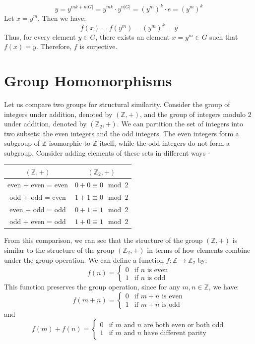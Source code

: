 \documentclass[openany]{book}
\begin{document}
\begin{enumerate}
\[y = y^{mk + n|G|} = y^{mk} \cdot y^{n|G|} = (y^m)^k \cdot e = (y^m)^k\]
    Let \(x = y^m\). Then we have:
    \[f(x) = f(y^m) = (y^m)^k = y\]
    Thus, for every element \(y \in G\), there exists an element \(x = y^m \in G\) such that \(f(x) = y\). Therefore, \(f\) is surjective.
\end{enumerate}
\section{Group Homomorphisms}
Let us compare two groups for structural similarity. Consider the group of integers under addition, denoted by \((\mathbb{Z}, +)\), and the group of integers modulo \(2\) under addition, denoted by \((\mathbb{Z}_2, +)\). We can partition the set of integers into two subsets: the even integers and the odd integers. The even integers form a subgroup of \(\mathbb{Z}\) isomorphic to \(\mathbb{Z}\) itself, while the odd integers do not form a subgroup. Consider adding elements of these sets in different ways -
\begin{center}
\begin{tabular}{c|c}
\((\mathbb{Z}, +)\) & \((\mathbb{Z}_2, +)\) \\
\hline
even + even = even & $0 + 0 \equiv 0 \mod 2$ \\
odd + odd = even & $1 + 1 \equiv 0 \mod 2$ \\
even + odd = odd & $0 + 1 \equiv 1 \mod 2$ \\
odd + even = odd & $1 + 0 \equiv 1 \mod 2$ \\
\hline
\end{tabular}
\end{center}
From this comparison, we can see that the structure of the group \((\mathbb{Z}, +)\) is similar to the structure of the group \((\mathbb{Z}_2, +)\) in terms of how elements combine under the group operation. We can define a function $f: \mathbb{Z} \to \mathbb{Z}_2$ by:
\[f(n) = \begin{cases}0 & \text{if } n \text{ is even} \\ 1 & \text{if } n \text{ is odd}\end{cases}\]
This function preserves the group operation, since for any \(m, n \in \mathbb{Z}\), we have:
\[f(m + n) = \begin{cases}0 & \text{if }m + n \text{ is even} \\ 1 & \text{if } m + n \text{ is odd}\end{cases}\]
and
\[f(m) + f(n) = \begin{cases}0 & \text{if }m \text{ and } n \text{ are both even or both odd} \\ 1 & \text{if }m \text{ and } n \text{ have different parity}\end{cases}\]
\end{document}
